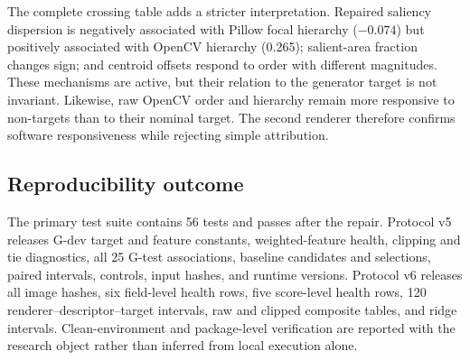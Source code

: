 The complete crossing table adds a stricter interpretation. Repaired saliency dispersion is negatively associated with Pillow focal hierarchy ($-0.074$) but positively associated with OpenCV hierarchy (0.265); salient-area fraction changes sign; and centroid offsets respond to order with different magnitudes. These mechanisms are active, but their relation to the generator target is not invariant. Likewise, raw OpenCV order and hierarchy remain more responsive to non-targets than to their nominal target. The second renderer therefore confirms software responsiveness while rejecting simple attribution.

\subsection{Reproducibility outcome}

The primary test suite contains 56 tests and passes after the repair. Protocol v5 releases G-dev target and feature constants, weighted-feature health, clipping and tie diagnostics, all 25 G-test associations, baseline candidates and selections, paired intervals, controls, input hashes, and runtime versions. Protocol v6 releases all image hashes, six field-level health rows, five score-level health rows, 120 renderer--descriptor--target intervals, raw and clipped composite tables, and ridge intervals. Clean-environment and package-level verification are reported with the research object rather than inferred from local execution alone.


\clearpage
